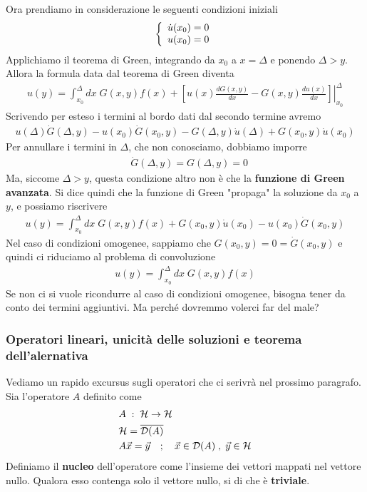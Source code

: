 Ora prendiamo in considerazione le seguenti condizioni iniziali
\begin{align}
	\left\{ \begin{array}{cc} \dot{u}(x_0)=0\\ u(x_0)=0 \end{array} \right.
\end{align}
Applichiamo il teorema di Green, integrando da $x_0$ a $x = \Delta$ e ponendo $\Delta > y$. 
Allora la formula data dal teorema di Green diventa
\begin{align}
	u(y) = \int_{x_0}^{\Delta} dx \; G(x,y) f(x) + \left.\left[ u(x) \frac{dG(x,y)}{dx} - G(x,y) \frac{du(x)}{dx} \right]\right|_{x_0}^\Delta
\end{align}
Scrivendo per esteso i termini al bordo dati dal secondo termine avremo
\begin{align}
	u(\Delta) \dot{G}(\Delta,y) - u(x_0) \dot{G}(x_0,y) - G(\Delta,y) \dot{u}(\Delta) + G(x_0,y) \dot{u}(x_0) 
\end{align}
Per annullare i termini in $\Delta$, che non conosciamo, dobbiamo imporre 
\begin{align}
	&\dot{G}(\Delta, y) = G(\Delta, y) = 0	
\end{align}
Ma, siccome $\Delta>y$, questa condizione altro non è che la \textbf{funzione di Green avanzata}. Si dice quindi che la funzione di Green "propaga" la soluzione da $x_0$ a $y$, e possiamo riscrivere
\begin{align}
	u(y) = \int_{x_0}^{\Delta} dx \; G(x,y) f(x) +  G(x_0,y) \dot{u}(x_0) - u(x_0) \dot{G}(x_0,y) 
\end{align}
Nel caso di condizioni omogenee, sappiamo che $G(x_0,y) = 0 = \dot{G}(x_0,y)$ e quindi ci riduciamo al problema di convoluzione
\begin{align}
	u(y) = \int_{x_0}^{\Delta} dx \; G(x,y) f(x)
\end{align}
Se non ci si vuole ricondurre al caso di condizioni omogenee, bisogna tener da conto dei termini aggiuntivi. Ma perché dovremmo volerci far del male?

\subsubsection{Operatori lineari, unicità delle soluzioni e teorema dell'alernativa}

Vediamo un rapido excursus sugli operatori che ci serivrà nel prossimo paragrafo. 
Sia l'operatore $A$ definito come
\begin{align}
	&A \; : \; \mathcal{H} \to \mathcal{H}\\
	&\mathcal{H} = \overline{\mathcal{D}(A)}\\
	&A \vec{x} = \vec{y} \quad ; \quad \vec{x} \in \mathcal{D}(A) \; , \; \vec{y} \in \mathcal{H} \label{syseq}
\end{align}
Definiamo il \textbf{nucleo} dell'operatore come l'insieme dei vettori mappati nel vettore nullo. Qualora esso contenga solo il vettore nullo, si di che è \textbf{triviale}.

